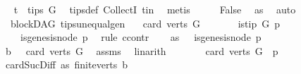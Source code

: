 \begin{isabellebody}
\ \isamarkupfalse%
\ {\isachardoublequoteopen}t\ {\isasymin}\ tips\ G{\isachardoublequoteclose}\ \isamarkupfalse%
\ tips{\isacharunderscore}{\kern0pt}def\ CollectI\ t{\isacharunderscore}{\kern0pt}in\ \isamarkupfalse%
\ metis\isanewline
\ \ \isamarkupfalse%
\ \isamarkupfalse%
\ False\ \isamarkupfalse%
\ as{}\ \isamarkupfalse%
\ auto\isanewline
{}\isamarkupfalse%
%
\endisatagproof
{\isafoldproof}%
%
\isadelimproof
\isanewline
%
\endisadelimproof
\isanewline
{}\isamarkupfalse%
\ {\isacharparenleft}{\kern0pt}\ blockDAG{\isacharparenright}{\kern0pt}\ tips{\isacharunderscore}{\kern0pt}unequal{\isacharunderscore}{\kern0pt}gen{\isacharcolon}{\kern0pt}\isanewline
\ \ \ {\isachardoublequoteopen}card{\isacharparenleft}{\kern0pt}\ verts\ G{\isacharparenright}{\kern0pt}\ {\isachargreater}{\kern0pt}\ {}{\isachardoublequoteclose}\isanewline
\ \ \ \ \ {\isachardoublequoteopen}is{\isacharunderscore}{\kern0pt}tip\ G\ p{\isachardoublequoteclose}\isanewline
\ \ \ {\isachardoublequoteopen}{\isasymnot}\ is{\isacharunderscore}{\kern0pt}genesis{\isacharunderscore}{\kern0pt}node\ p\ {\isachardoublequoteclose}\isanewline
%
\isadelimproof
%
\endisadelimproof
%
\isatagproof
{}\isamarkupfalse%
\ {\isacharparenleft}{\kern0pt}rule\ ccontr{\isacharparenright}{\kern0pt}\isanewline
\ \ \isamarkupfalse%
\ as{\isacharcolon}{\kern0pt}\ {\isachardoublequoteopen}{\isasymnot}\ {\isasymnot}\ is{\isacharunderscore}{\kern0pt}genesis{\isacharunderscore}{\kern0pt}node\ p{\isachardoublequoteclose}\isanewline
\ \ \isamarkupfalse%
\ b{}{\isacharcolon}{\kern0pt}\ {\isachardoublequoteopen}{}\ {\isacharless}{\kern0pt}\ card\ {\isacharparenleft}{\kern0pt}verts\ G{\isacharparenright}{\kern0pt}{\isachardoublequoteclose}\ \isamarkupfalse%
\ assms\ \isamarkupfalse%
\ linarith\isanewline
\ \ \isamarkupfalse%
\ \isamarkupfalse%
\ {\isachardoublequoteopen}{}\ {\isacharless}{\kern0pt}\ card\ {\isacharparenleft}{\kern0pt}{\isacharparenleft}{\kern0pt}verts\ G{\isacharparenright}{\kern0pt}\ {\isacharminus}{\kern0pt}\ {\isacharbraceleft}{\kern0pt}p{\isacharbraceright}{\kern0pt}{\isacharparenright}{\kern0pt}{\isachardoublequoteclose}\ \isamarkupfalse%
\ card{\isacharunderscore}{\kern0pt}Suc{\isacharunderscore}{\kern0pt}Diff{}\ as\ finite{\isacharunderscore}{\kern0pt}verts\ b{}\ \isamarkupfalse%

\end{isabellebody}
